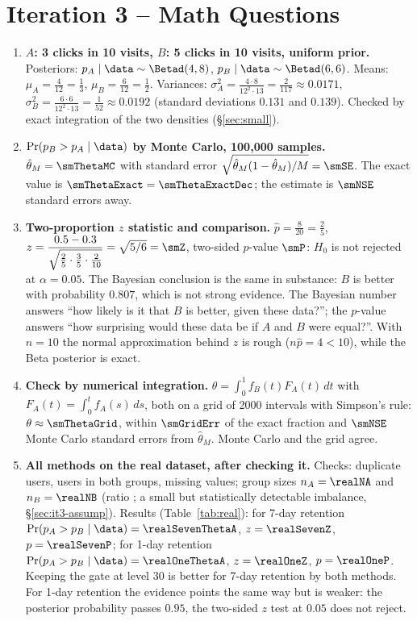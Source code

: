 \section{Iteration 3 -- Math Questions}\label{sec:it3-questions}

\begin{enumerate}[label=\textbf{Q\arabic*.},leftmargin=*]
\item \textbf{$A$: 3 clicks in 10 visits, $B$: 5 clicks in 10 visits, uniform prior.}
  Posteriors: $p_A\mid\data\sim\Betad(4,8)$, $p_B\mid\data\sim\Betad(6,6)$.
  Means: $\mu_A=\frac4{12}=\frac13$, $\mu_B=\frac6{12}=\frac12$.
  Variances: $\sigma_A^2=\frac{4\cdot8}{12^2\cdot13}=\frac2{117}\approx0.0171$,
  $\sigma_B^2=\frac{6\cdot6}{12^2\cdot13}=\frac1{52}\approx0.0192$ (standard deviations $0.131$ and $0.139$).
  Checked by exact integration of the two densities (\S\ref{sec:small}).

\item \textbf{$\Pr(p_B>p_A\mid\data)$ by Monte Carlo, 100{,}000 samples.}
  $\hat\theta_M=\smThetaMC$ with standard error $\sqrt{\hat\theta_M(1-\hat\theta_M)/M}=\smSE$.
  The exact value is $\smThetaExact=\smThetaExactDec$; the estimate is $\smNSE$ standard errors away.

\item \textbf{Two-proportion $z$ statistic and comparison.}
  $\hat p=\frac8{20}=\frac25$, $z=\dfrac{0.5-0.3}{\sqrt{\frac25\cdot\frac35\cdot\frac2{10}}}=\sqrt{5/6}=\smZ$,
  two-sided $p$-value $\smP$: $H_0$ is not rejected at $\alpha=0.05$. The Bayesian conclusion is the same in
  substance: $B$ is better with probability $0.807$, which is not strong evidence. The Bayesian number answers
  ``how likely is it that $B$ is better, given these data?''; the $p$-value answers ``how surprising would these
  data be if $A$ and $B$ were equal?''. With $n=10$ the normal approximation behind $z$ is rough
  ($n\hat p=4<10$), while the Beta posterior is exact.

\item \textbf{Check by numerical integration.}
  $\theta=\int_0^1 f_B(t)F_A(t)\,dt$ with $F_A(t)=\int_0^t f_A(s)\,ds$, both on a grid of 2000 intervals with
  Simpson's rule: $\theta\approx\smThetaGrid$, within $\smGridErr$ of the exact fraction and $\smNSE$ Monte Carlo
  standard errors from $\hat\theta_M$. Monte Carlo and the grid agree.

\item \textbf{All methods on the real dataset, after checking it.}
  Checks: \realDup{} duplicate users, \realBoth{} users in both groups, \realMissing{} missing values; group sizes
  $n_A=\realNA$ and $n_B=\realNB$ (ratio \realRatio; a small but statistically detectable imbalance,
  \S\ref{sec:it3-assump}). Results (Table~\ref{tab:real}): for 7-day retention $\Pr(p_A>p_B\mid\data)=\realSevenThetaA$,
  $z=\realSevenZ$, $p=\realSevenP$; for 1-day retention $\Pr(p_A>p_B\mid\data)=\realOneThetaA$, $z=\realOneZ$,
  $p=\realOneP$. Keeping the gate at level 30 is better for 7-day retention by both methods. For 1-day retention the
  evidence points the same way but is weaker: the posterior probability passes $0.95$, the two-sided $z$ test at
  $0.05$ does not reject.
\end{enumerate}
